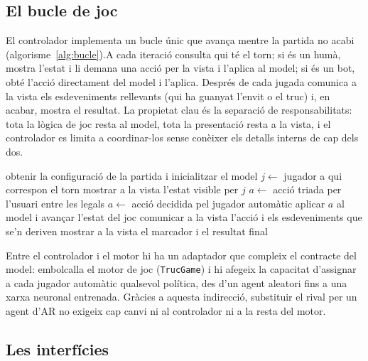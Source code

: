 \subsection*{El bucle de joc}

El controlador implementa un bucle únic que avança mentre la partida no acabi
(algorisme~\ref{alg:bucle}).A cada iteració consulta qui té el torn; si
és un humà, mostra l'estat i li demana una acció per la vista i l'aplica al model;
si és un bot, obté l'acció directament del model i l'aplica. Després de cada jugada
comunica a la vista els esdeveniments rellevants (qui ha guanyat l'envit o el
truc) i, en acabar, mostra el resultat. La propietat clau és la separació de responsabilitats: tota la
lògica de joc resta al model, tota la presentació resta a la vista, i el controlador
es limita a coordinar-los sense conèixer els detalls interns de cap dels dos.

\begin{algorithm}[H]
  \caption{Bucle principal de joc gestionat pel controlador.}
  \label{alg:bucle}
  \begin{algorithmic}[1]
    \State obtenir la configuració de la partida i inicialitzar el model
      \State $j \gets$ jugador a qui correspon el torn
        \State mostrar a la vista l'estat visible per $j$
        \State $a \gets$ acció triada per l'usuari entre les legals
      \Else
        \State $a \gets$ acció decidida pel jugador automàtic
      \EndIf
      \State aplicar $a$ al model i avançar l'estat del joc
      \State comunicar a la vista l'acció i els esdeveniments que se'n deriven
    \EndWhile
    \State mostrar a la vista el marcador i el resultat final
  \end{algorithmic}
\end{algorithm}

Entre el controlador i el motor hi ha un adaptador que compleix el contracte del
model: embolcalla el motor de joc (\texttt{TrucGame}) i hi afegeix la capacitat
d'assignar a cada jugador automàtic qualsevol política, des d'un agent aleatori fins
a una xarxa neuronal entrenada. Gràcies a aquesta indirecció, substituir el rival per
un agent d'\ac{AR} no exigeix cap canvi ni al controlador ni a la resta del motor.

\subsection*{Les interfícies}

